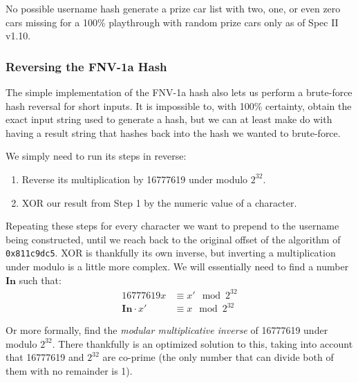 \documentclass[14pt,a4paper,notitlepage]{extarticle}
\begin{document}
                No possible username hash generate a prize car list with two, one,
                or even zero cars missing for a 100\% playthrough with random prize cars only
                as of Spec II v1.10.

            \subsubsection*{Reversing the FNV-1a Hash}
                The simple implementation of the FNV-1a hash also lets us perform a brute-force hash
                reversal for short inputs. It is impossible to, with 100\% certainty, obtain the exact
                input string used to generate a hash, but we can at least make do with having a result
                string that hashes back into the hash we wanted to brute-force.

                We simply need to run its steps in reverse:

                \begin{enumerate}
                    \item Reverse its multiplication by 16777619 under modulo $2^{32}$.
                    \item XOR our result from Step 1 by the numeric value of a character.
                \end{enumerate}

                Repeating these steps for every character we want to prepend to the
                username being constructed, until we reach back to the original offset
                of the algorithm of \texttt{0x811c9dc5}.
                XOR is thankfully its own inverse, but
                inverting a multiplication under modulo is a little more complex.
                We will essentially need to find a number $\mathbf{In}$ such that:
                \begin{align*}
                    16777619x &\equiv x' \mod 2^{32}\\
                    \mathbf{In} \cdot x' &\equiv x \mod 2^{32}
                \end{align*}

                Or more formally, find the \textit{modular multiplicative inverse} of
                16777619 under modulo $2^{32}$. There thankfully is an optimized solution
                to this, taking into account that 16777619 and $2^{32}$ are co-prime
                (the only number that can divide both of them with no remainder is 1).
\end{document}
